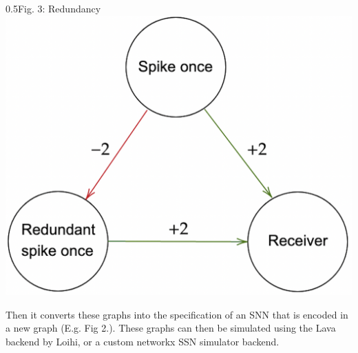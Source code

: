 \begin{rudifig}{0.5\hsize}{Fig. 3: Redundancy}
    \includegraphics[width=1\linewidth]{latex/Images/brain_adaptation_alternative.png}
    \label{fig:eg_brain_adaptation}
\end{rudifig}

Then it converts these graphs into the specification of an SNN that is encoded in a new graph (E.g. Fig 2.). These graphs can then be simulated using the Lava backend by Loihi, or a custom networkx SSN simulator backend.


